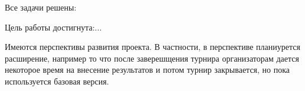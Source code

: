
Все задачи решены:

Цель работы достигнута:...

Имеются перспективы развития проекта. В частности, в перспективе планиурется расширение, например то что после заверешщения турнира организаторам дается некоторое время на внесение результатов и потом турнир закрывается, но пока используется базовая версия.